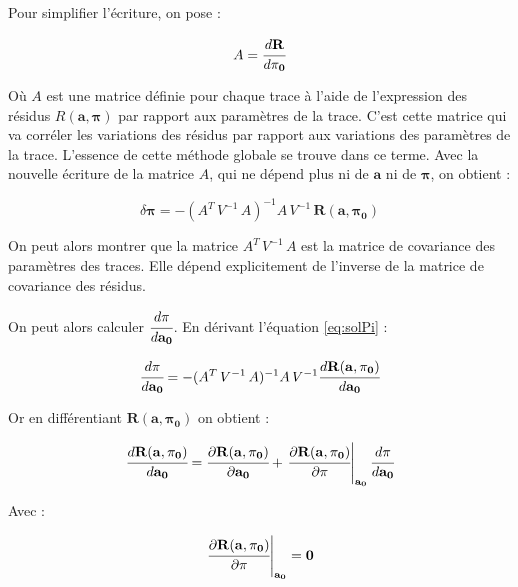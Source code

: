    Pour simplifier l'\'ecriture, on pose :
   
   \begin{equation}
    A =  \cfrac{ d \mathbf{R} }{d \mathbf{\pi_0}}
   \end{equation}
   
   O\`u $A$ est une matrice d\'efinie pour chaque trace \`a l'aide de l'expression des r\'esidus $R(\mathbf{a}, \mathbf{\pi})$ par rapport aux param\`etres de la trace. C'est cette matrice qui va corr\'eler les variations des r\'esidus par rapport aux variations des param\`etres de la trace. L'essence de cette m\'ethode globale se trouve dans ce terme.  Avec la nouvelle \'ecriture de la matrice $A$, qui ne d\'epend plus ni de $\mathbf{a}$ ni de $\mathbf{\pi}$, on obtient :
   
   \begin{equation}
    \delta \mathbf{\pi} = - (A^T \, V^{-1} \, A)^{-1} A \, V^{-1} \, \mathbf{R}(\mathbf{a}, \mathbf{\pi_0})
   \end{equation}

   On peut alors montrer que la matrice $A^T \, V^{-1} \, A$ est la matrice de covariance des param\`etres des traces. Elle d\'epend explicitement de l'inverse de la matrice de covariance des r\'esidus.
   
   On peut alors calculer $\cfrac{ d \mathbf{\pi} }{d \mathbf{a_0}}$. En d\'erivant l'\'equation \ref{eq:solPi} :
   
   \begin{equation}
    \cfrac{ d \mathbf{\pi} }{d \mathbf{a_0}} = - (A^T \, V^{-1} \, A)^{-1} A \, V^{-1}  \cfrac{ d \mathbf{R}(\mathbf{a}, \mathbf{\pi_0}) }{d \mathbf{a_0}}
   \end{equation}

   Or en diff\'erentiant $\mathbf{R(\mathbf{a}, \mathbf{\pi_0})}$ on obtient :
   
   \begin{equation}
     \cfrac{ d \mathbf{R}(\mathbf{a}, \mathbf{\pi_0}) }{d \mathbf{a_0}} =  \cfrac{ \partial \mathbf{R}(\mathbf{a}, \mathbf{\pi_0}) }{ \partial \mathbf{a_0}} + \left. \cfrac{ \partial \mathbf{R}(\mathbf{a}, \mathbf{\pi_0}) }{ \partial \mathbf{\pi}}\right|_{\mathbf{a_0}} \cfrac{ d \mathbf{\pi} }{d \mathbf{a_0}}
   \end{equation}

   Avec :
   
   \begin{equation}
    \left. \cfrac{ \partial \mathbf{R}(\mathbf{a}, \mathbf{\pi_0}) }{ \partial \mathbf{\pi}}\right|_{\mathbf{a_0}} = \mathbf{0}
   \end{equation}
   
